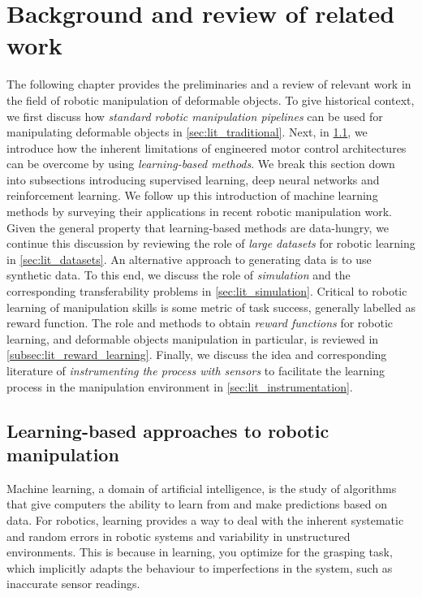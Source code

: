 \documentclass[\home/main.tex]{subfiles}
\begin{document}
\chapter{Background and review of related work} \label{ch:lit}

The following chapter provides the preliminaries and a review of relevant work in the field of robotic manipulation of deformable objects. To give historical context, we first discuss how \emph{standard robotic manipulation pipelines} can be used for manipulating deformable objects in \cref{sec:lit_traditional}. Next, in \cref{sec:lit_learning}, we introduce how the inherent limitations of engineered motor control architectures can be overcome by using \emph{learning-based methods}. We break this section down into subsections introducing supervised learning, deep neural networks and reinforcement learning. We follow up this introduction of machine learning methods by surveying their applications in recent robotic manipulation work. Given the general property that learning-based methods are data-hungry, we continue this discussion by reviewing the role of \emph{large datasets} for robotic learning in \cref{sec:lit_datasets}. An alternative approach to generating data is to use synthetic data. To this end, we discuss the role of \emph{simulation} and the corresponding transferability problems in \cref{sec:lit_simulation}. Critical to robotic learning of manipulation skills is some metric of task success, generally labelled as reward function. The role and methods to obtain \emph{reward functions} for robotic learning, and deformable objects manipulation in particular, is reviewed in \cref{subsec:lit_reward_learning}. Finally, we discuss the idea and corresponding literature of \emph{instrumenting the process with sensors} to facilitate the learning process in the manipulation environment in \cref{sec:lit_instrumentation}.




\section{Learning-based approaches to robotic manipulation} \label{sec:lit_learning}

Machine learning, a domain of artificial intelligence, is the study of algorithms that give computers the ability to learn from and make predictions based on data. For robotics, learning provides a way to deal with the inherent systematic and random errors in robotic systems and variability in unstructured environments. This is because in learning, you optimize for the grasping task, which implicitly adapts the behaviour to imperfections in the system, such as inaccurate sensor readings.
\end{document}

